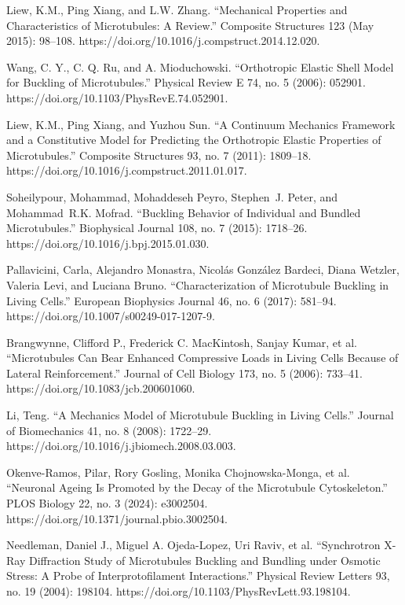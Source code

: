 \begin{thebibliography}{00}
\bibitem[]{}
Liew, K.M., Ping Xiang, and L.W. Zhang. “Mechanical Properties and Characteristics of Microtubules: A Review.” Composite Structures 123 (May 2015): 98–108. https://doi.org/10.1016/j.compstruct.2014.12.020. %

\bibitem[]{}
Wang, C. Y., C. Q. Ru, and A. Mioduchowski. “Orthotropic Elastic Shell Model for Buckling of Microtubules.” Physical Review E 74, no. 5 (2006): 052901. https://doi.org/10.1103/PhysRevE.74.052901. %

\bibitem[]{}
Liew, K.M., Ping Xiang, and Yuzhou Sun. “A Continuum Mechanics Framework and a Constitutive Model for Predicting the Orthotropic Elastic Properties of Microtubules.” Composite Structures 93, no. 7 (2011): 1809–18. https://doi.org/10.1016/j.compstruct.2011.01.017. %


\bibitem[]{}
Soheilypour, Mohammad, Mohaddeseh Peyro, Stephen J. Peter, and Mohammad R.K. Mofrad. “Buckling Behavior of Individual and Bundled Microtubules.” Biophysical Journal 108, no. 7 (2015): 1718–26. https://doi.org/10.1016/j.bpj.2015.01.030. %


\bibitem[]{}
Pallavicini, Carla, Alejandro Monastra, Nicolás González Bardeci, Diana Wetzler, Valeria Levi, and Luciana Bruno. “Characterization of Microtubule Buckling in Living Cells.” European Biophysics Journal 46, no. 6 (2017): 581–94. https://doi.org/10.1007/s00249-017-1207-9. %

\bibitem[]{}
Brangwynne, Clifford P., Frederick C. MacKintosh, Sanjay Kumar, et al. “Microtubules Can Bear Enhanced Compressive Loads in Living Cells Because of Lateral Reinforcement.” Journal of Cell Biology 173, no. 5 (2006): 733–41. https://doi.org/10.1083/jcb.200601060. %

\bibitem[]{}
Li, Teng. “A Mechanics Model of Microtubule Buckling in Living Cells.” Journal of Biomechanics 41, no. 8 (2008): 1722–29. https://doi.org/10.1016/j.jbiomech.2008.03.003. %



Okenve-Ramos, Pilar, Rory Gosling, Monika Chojnowska-Monga, et al. “Neuronal Ageing Is Promoted by the Decay of the Microtubule Cytoskeleton.” PLOS Biology 22, no. 3 (2024): e3002504. https://doi.org/10.1371/journal.pbio.3002504. 

\bibitem[]{}
Needleman, Daniel J., Miguel A. Ojeda-Lopez, Uri Raviv, et al. “Synchrotron X-Ray Diffraction Study of Microtubules Buckling and Bundling under Osmotic Stress: A Probe of Interprotofilament Interactions.” Physical Review Letters 93, no. 19 (2004): 198104. https://doi.org/10.1103/PhysRevLett.93.198104. %


\end{thebibliography}
